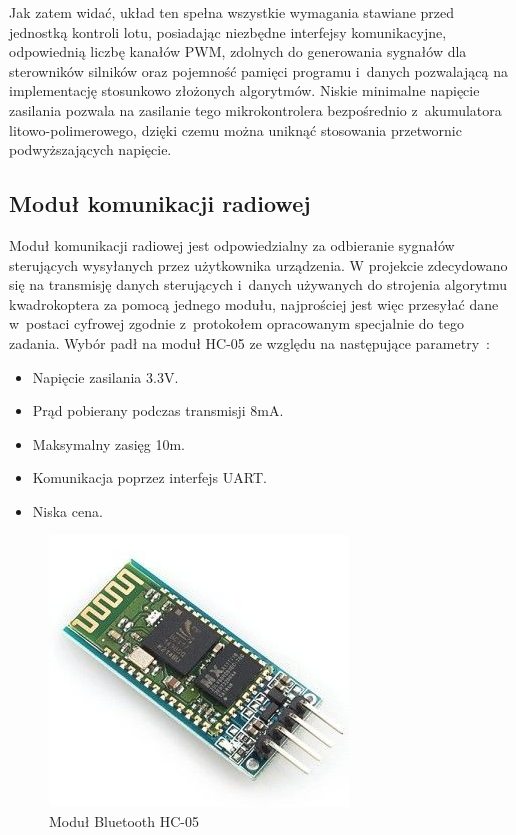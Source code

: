 \documentclass[11pt, twoside]{Thesis} %
\begin{document}
Jak zatem widać, układ ten spełna wszystkie wymagania stawiane przed jednostką kontroli lotu, posiadając niezbędne interfejsy komunikacyjne, odpowiednią liczbę kanałów PWM, zdolnych do generowania sygnałów dla sterowników silników oraz pojemność pamięci programu i~danych pozwalającą na implementację stosunkowo złożonych algorytmów. Niskie minimalne napięcie zasilania pozwala na zasilanie tego mikrokontrolera bezpośrednio z~akumulatora litowo-polimerowego, dzięki czemu można uniknąć stosowania przetwornic podwyższających napięcie.

\subsection{Moduł komunikacji radiowej}
Moduł komunikacji radiowej jest odpowiedzialny za odbieranie sygnałów sterujących wysyłanych przez użytkownika urządzenia. W projekcie zdecydowano się na transmisję danych sterujących i~danych używanych do strojenia algorytmu kwadrokoptera za pomocą jednego modułu, najprościej jest więc przesyłać dane w~postaci cyfrowej zgodnie z~protokołem opracowanym specjalnie do tego zadania. Wybór padł na moduł HC-05 ze względu na następujące parametry~\cite{ds_hc05}:

\begin{itemize}
	\item Napięcie zasilania 3.3V.
	\item Prąd pobierany podczas transmisji 8mA.
	\item Maksymalny zasięg 10m.
	\item Komunikacja poprzez interfejs UART.
	\item Niska cena.
\end{itemize}

\begin{figure}[H]
	\centering
	\includegraphics[scale=0.7]{Pictures/HC-05.jpg}
		\caption[Moduł Bluetooth HC-05]{Moduł Bluetooth HC-05~\cite{ds_hc05}}
	\label{fig:hc-05}
\end{figure}
\end{document}
